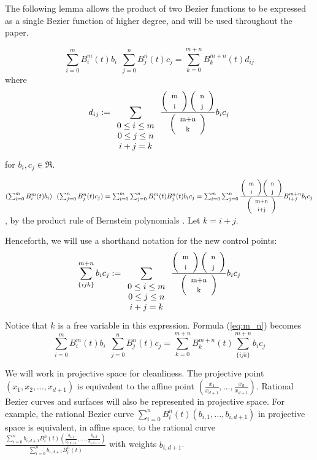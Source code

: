 The following lemma allows the product of two Bezier functions to be
expressed as a single Bezier function of higher degree, and will be
used throughout the paper.

\begin{lemma}
\label{lem:product}
\begin{equation}
\label{eq:m_n}
\sum_{i=0}^{m} B_i^m(t) b_i \ \ \sum_{j=0}^{n} B_j^n(t) c_j
= \sum_{k=0}^{m+n} B_k^{m+n}(t) d_{ij}
\end{equation}
where
\[
d_{ij} := \sum_{\begin{array}{c} 0 \leq i \leq m \\ 
			     0 \leq j \leq n \\ 
			     i+j=k
			     \end{array}}
	\frac{\left( \begin{array}{c} \mbox{\footnotesize{m}} \\ \mbox{\footnotesize{i}} \end{array} \right) \left( \begin{array}{c} \mbox{\footnotesize{n}} \\ \mbox{\footnotesize{j}} \end{array} \right)}{\left( \begin{array}{c} \mbox{\footnotesize{m+n}} \\ \mbox{\footnotesize{k}} \end{array} \right)}  b_i c_j
\]
for $b_i,c_j \in \Re$.
\end{lemma}
\prf
$(\sum_{i=0}^{m} B_i^m(t) b_i) \ \ (\sum_{j=0}^{n} B_j^n(t) c_j)
= \sum_{i=0}^{m} \sum_{j=0}^{n} B_i^m(t) B_j^n(t) b_i c_j
= \sum_{i=0}^{m} \sum_{j=0}^{n} 
	\frac{\choice{m}{i} \choice{n}{j}}{\choice{m+n}{i+j}}
	B_{i+j}^{m+n} b_i c_j$,
by the product rule of Bernstein polynomials \cite{farin93}.
Let $k=i+j$.
\QED

Henceforth, we will use a shorthand notation for the new control points:
\begin{equation}
\sum_{\{ijk\}}^{m+n} b_i c_j := 
\sum_{\begin{array}{c} 0 \leq i \leq m \\ 
		     0 \leq j \leq n \\ 
		     i+j=k
		     \end{array}}
\frac{\left( \begin{array}{c} \mbox{\footnotesize{m}} \\ \mbox{\footnotesize{i}} \end{array} \right) \left( \begin{array}{c} \mbox{\footnotesize{n}} \\ \mbox{\footnotesize{j}} \end{array} \right)}{\left( \begin{array}{c} \mbox{\footnotesize{m+n}} \\ \mbox{\footnotesize{k}} \end{array} \right)} b_i c_j
\end{equation}
Notice that $k$ is a free variable in this expression.
Formula (\ref{eq:m_n}) becomes
\begin{equation}
\sum_{i=0}^{m} B_i^m(t) b_i \ \ \sum_{j=0}^{n} B_j^n(t) c_j
= \sum_{k=0}^{m+n} B_k^{m+n}(t) \sum_{\{ijk\}}^{m+n} b_i c_j
\end{equation}

We will work in projective space for cleanliness.
The projective point $(x_1,x_2,\ldots,x_{d+1})$ is equivalent
to the affine point $(\frac{x_1}{x_{d+1}},\ldots,\frac{x_d}{x_{d+1}})$.
Rational Bezier curves and surfaces will also be represented in projective
space.
For example, the rational Bezier curve 
$\sum_{i=0}^{n} B_i^n(t) (b_{i,1},\ldots,b_{i,d+1})$ in projective space is
equivalent, in affine space, to the rational curve 
$\frac{\sum_{i=0}^{n} b_{i,d+1} B_i^n(t) 
	(\frac{b_{i,1}}{b_{i,d+1}},\ldots,\frac{b_{i,d}}{b_{i,d+1}})}
      {\sum_{i=0}^{n} b_{i,d+1} B_i^n(t)}$
with weights $b_{i,d+1}$.

